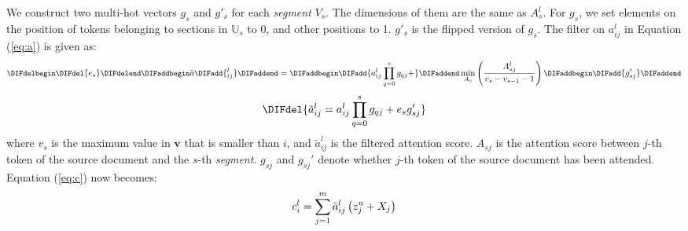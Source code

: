 We construct two multi-hot vectors $g_{s}$ and $g'_{s}$ for each \textit{segment} $V_{s}$.
The dimensions of them are the
same as $A_{s}^{l}$. For $g_{s}$, we set elements on the position of tokens
belonging to sections in $\mathbb{U}_{s}$ to 0, and other
positions to 1. $g'_{s}$ is the flipped version of $g_{s}$. 
The filter on $a_{ij}^{l}$ in Equation (\ref{eq:a}) is given as:
\begin{equation}
\small
	\DIFdelbegin \DIFdel{e_{s} }\DIFdelend \DIFaddbegin \tilde{a}\DIFadd{_{ij}^{l} }\DIFaddend = \DIFaddbegin \DIFadd{a_{ij}^{l}\prod_{q=0}^{s}g_{qj} + }\DIFaddend \min \limits_{A_{s}}\left(\frac{A_{sj}^{l}}{v_{s}-v_{s-1}-1}\right)\DIFaddbegin \DIFadd{g_{sj}'
}\DIFaddend \end{equation}
\DIFdelbegin \begin{displaymath}
\DIFdel{\small
    \tilde{a}_{ij}^{l} = a_{ij}^{l}\prod_{q=0}^{s}g_{qj} + e_{s}g_{sj}'
}\end{displaymath}
\DIFdelend where $v_{s}$ is the maximum value in 
$\mathbf{v}$ that is smaller than $i$, and $\tilde{a}_{ij}^l$ is the filtered
attention score. $A_{sj}$ is the attention score between $j$-th token
of the source document and the $s$-th \textit{segment}. 
$g_{sj}$ and $g_{sj}'$ denote whether $j$-th token
of the source document has been attended.
Equation (\ref{eq:c}) now becomes:
\begin{equation}
\small
    c _ { i } ^ { l } = \sum _ { j = 1 } ^ { m } \tilde{a}_{ij}^{l} \left( z _ { j } ^ { u } + X_j \right)
\end{equation}

